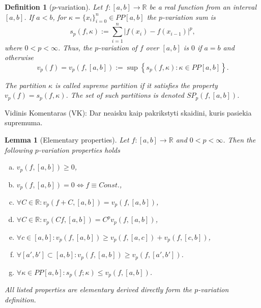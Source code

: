 \documentclass[12pt, a4paper]{article}
\newtheorem{lemma}[theorem]{Lemma}
\newtheorem{definition}[theorem]{Definition}
\numberwithin{equation}{section}
\begin{document}
\begin{definition}[$p$-variation]\label{def:pvar}
  Let $f:[a,b] \rightarrow \mathbb{R}$ be a real function from 
  an interval $[a,b]$.
  If $a<b$, for  $\kappa =\{x_{i}\}_{i=0}^{n} \in PP[a,b]$ 
  the \emph{$p$-variation sum} is 
  \begin{equation}\label{eq:def_pvarsum}
    s_{p}(f,\kappa):=\sum_{i=1}^{n}| f( x_{i}) -f( x_{i-1})|^{p},
  \end{equation}
  where $0<p<\infty $. Thus, the \emph{$p$-variation} 
  of $f$ over $[a,b]$ is $0$ if $a = b$ and otherwise
  \begin{equation}\label{eq:def_pvar}
    v_{p}(f) =v_{p}(f,[a,b]) :=\sup \left\{
    s_{p}(f,\kappa ):\kappa \in PP[a,b]\right\}.    
  \end{equation}
  
  The partition $\kappa$ is called \emph{supreme partition} 
  if it satisfies the property $v_{p}(f) = s_{p}(f,\kappa)$.
  The set of such partitions is denoted
  $SP_{p}(f,[a,b])$.
  
\end{definition}  
 
Vidinis Komentaras (VK): Dar neaisku kaip pakrikstyti skaidini, kuris pasiekia supremuma. 
 
 
 
\begin{lemma}[Elementary properties]\label{lm:element_properties} 
  Let $f:[a,b] \rightarrow \mathbb{R}$ and $0<p<\infty $. 
  Then the following $p$-variation properties holds
  \begin{enumerate}[a)]
    \item \label{lm:ep_a} $ v_p(f,[a,b]) \geq 0 $,
    \item \label{lm:ep_b} $ v_p(f,[a,b]) = 0 \Leftrightarrow f \equiv Const. $,
    \item \label{lm:ep_c} $ \forall C \in \mathbb{R}: v_p(f+C,[a,b]) = v_p(f,[a,b]) $,  
    \item \label{lm:ep_d} $ \forall C \in \mathbb{R}: v_p(Cf,[a,b]) = C^p v_p(f,[a,b]) $,  
    \item \label{lm:ep_e} $ \forall c \in [a,b]: v_p(f,[a,b]) \geq v_p(f,[a,c]) + v_p(f,[c,b]) $,  
    \item \label{lm:ep_f} $ \forall [a',b'] \subset [a,b] : v_p(f,[a,b]) \geq v_p(f,[a',b']) $.  
    \item \label{lm:ep_g} $ \forall \kappa \in PP[a,b]:s_{p}(f;\kappa) \leq v_p(f,[a,b]) $.  
  \end{enumerate}

  All listed properties are elementary derived directly form the $p$-variation definition.
\end{lemma}
 
\end{document}
